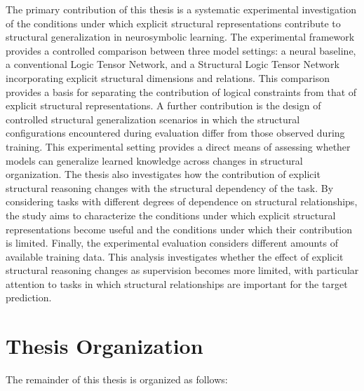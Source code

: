 \noindent
The primary contribution of this thesis is a systematic experimental investigation of the conditions under which explicit structural representations contribute to structural generalization in neurosymbolic learning.
The experimental framework provides a controlled comparison between three model settings: a neural baseline, a conventional Logic Tensor Network, and a Structural Logic Tensor Network incorporating explicit structural dimensions and relations. This comparison provides a basis for separating the contribution of logical constraints from that of explicit structural representations.
A further contribution is the design of controlled structural generalization scenarios in which the structural configurations encountered during evaluation differ from those observed during training. This experimental setting provides a direct means of assessing whether models can generalize learned knowledge across changes in structural organization.
The thesis also investigates how the contribution of explicit structural reasoning changes with the structural dependency of the task. By considering tasks with different degrees of dependence on structural relationships, the study aims to characterize the conditions under which explicit structural representations become useful and the conditions under which their contribution is limited.
Finally, the experimental evaluation considers different amounts of available training data. This analysis investigates whether the effect of explicit structural reasoning changes as supervision becomes more limited, with particular attention to tasks in which structural relationships are important for the target prediction.

\section{Thesis Organization}

\noindent
The remainder of this thesis is organized as follows:

